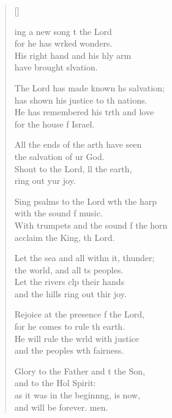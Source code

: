 \settowidth{\versewidth}{With trumpets and the sound of the horn}
\begin{verse}[\versewidth]
  \begin{patverse}
ing a new song t the Lord\Med\\
for he has wrked wonders.\\
His right hand and his hly arm\Med\\
have brought slvation.

The Lord has made known h\pointup{\i}s salvation;\Med\\
has shown his justice to th nations.\\
He has remembered his trth and love\Med\\
for the house f Israel.

All the ends of the arth have seen\Med\\
the salvation of ur God.\\
Shout to the Lord, ll the earth,\Med\\
ring out yur joy.

Sing psalms to the Lord w\pointup{\i}th the harp\Med\\
with the sound f music.\\
With trumpets and the sound f the horn\Med\\
acclaim the King, th Lord.

Let the sea and all with\pointup{\i}n it, thunder;\Med\\
the world, and all \pointup{\i}ts peoples.\\
Let the rivers clp their hands\Med\\
and the hills ring out thir joy.

Rejoice at the presence f the Lord,\Med\\
for he comes to rule th earth.\\
He will rule the wrld with justice\Med\\
and the peoples w\pointup{\i}th fairness.

Glory to the Father and t the Son,\Med\\
and to the Hol Spirit:\\
as it was in the beginn\pointup{\i}ng, is now,\Med\\
and will be forever. men. 
  \end{patverse}
\end{verse}
